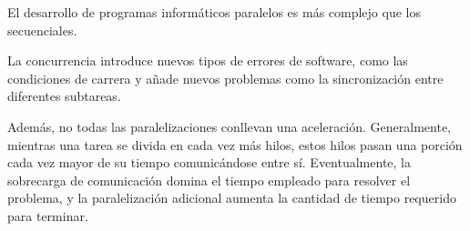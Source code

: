 \vspace{2mm}
El desarrollo de programas informáticos paralelos es más complejo que los secuenciales. 
\vspace{2mm}

La concurrencia introduce nuevos tipos de errores de software, como las condiciones de carrera y añade nuevos problemas como la sincronización entre diferentes subtareas. 
\vspace{2mm}


Además, no todas las paralelizaciones conllevan una aceleración. Generalmente, mientras una tarea se divida en cada vez más hilos, estos hilos pasan una porción cada vez mayor de su tiempo comunicándose entre sí. Eventualmente, la sobrecarga de comunicación domina el tiempo empleado para resolver el problema, y la paralelización adicional aumenta la cantidad de tiempo requerido para terminar.
\vspace{2mm}
